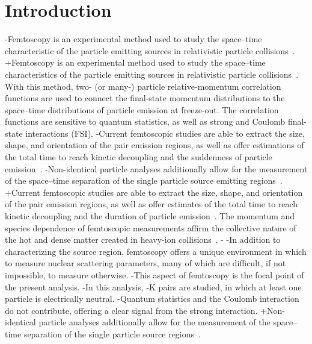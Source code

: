 { \section{Introduction}
 \label{sec:Introduction}
 
-Femtoscopy is an experimental method used to study the space--time characteristic of the particle emitting sources in relativistic particle collisions~\cite{Lisa:2005dd}.  
+Femtoscopy is an experimental method used to study the space--time characteristics of the particle emitting sources in relativistic particle collisions~\cite{Lisa:2005dd, Kopylov:1972qw}.  
 With this method, two- (or many-) particle relative-momentum correlation functions are used to connect the final-state momentum distributions to the space--time distributions of particle emission at freeze-out.  
 The correlation functions are sensitive to quantum statistics, as well as strong and Coulomb final-state interactions (FSI).  
-Current femtoscopic studies are able to extract the size, shape, and orientation of the pair emission regions, as well as offer estimations of the total time to reach kinetic decoupling and the suddenness of particle emission~\cite{Lisa:2005dd, Lisa:2008gf}.
-Non-identical particle analyses additionally allow for the measurement of the space--time separation of the single particle source emitting regions~\cite{Lednicky:1995vk, Voloshin:1997jh, Lednicky:2001qv, Retiere:2003kf}.
+Current femtoscopic studies are able to extract the size, shape, and orientation of the pair emission regions, as well as offer estimates of the total time to reach kinetic decoupling and the duration of particle emission~\cite{Lisa:2005dd, Lisa:2008gf}.
 The momentum and species dependence of femtoscopic measurements affirm the collective nature of the hot and dense matter created in heavy-ion collisions~\cite{Makhlin:1987gm, Akkelin:1995gh, Retiere:2003kf, Kisiel:2009eh}.
-
-In addition to characterizing the source region, femtoscopy offers a unique environment in which to measure nuclear scattering parameters, many of which are difficult, if not impossible, to measure otherwise.  
-This aspect of femtoscopy is the focal point of the present analysis. 
-In this analysis, \Lam-K pairs are studied, in which at least one particle is electrically neutral.  
-Quantum statistics and the Coulomb interaction do not contribute, offering a clear signal from the strong interaction.
+Non-identical particle analyses additionally allow for the measurement of the space--time separation of the single particle source regions~\cite{Lednicky:1995vk, Voloshin:1997jh, Lednicky:2001qv, Retiere:2003kf}.
}
